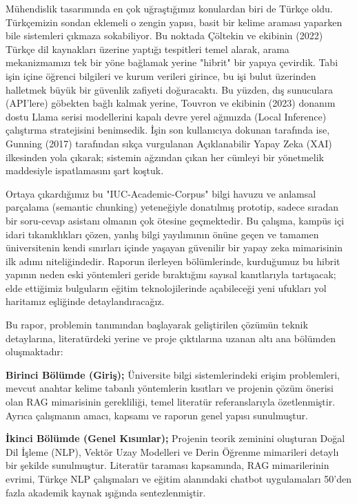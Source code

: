 \documentclass[12pt,a4paper]{report}
\begin{document}
Mühendislik tasarımında en çok uğraştığımız konulardan biri de Türkçe oldu. Türkçemizin sondan eklemeli o zengin yapısı, basit bir kelime araması yaparken bile sistemleri çıkmaza sokabiliyor. Bu noktada Çöltekin ve ekibinin (2022) Türkçe dil kaynakları üzerine yaptığı tespitleri \cite{coltekin2022turkish} temel alarak, arama mekanizmamızı tek bir yöne bağlamak yerine "hibrit" bir yapıya çevirdik. Tabi işin içine öğrenci bilgileri ve kurum verileri girince, bu işi bulut üzerinden halletmek büyük bir güvenlik zafiyeti doğuracaktı. Bu yüzden, dış sunuculara (API'lere) göbekten bağlı kalmak yerine, Touvron ve ekibinin (2023) donanım dostu Llama serisi modellerini \cite{touvron2023llama} kapalı devre yerel ağımızda (Local Inference) çalıştırma stratejisini benimsedik. İşin son kullanıcıya dokunan tarafında ise, Gunning (2017) tarafından sıkça vurgulanan Açıklanabilir Yapay Zeka (XAI) ilkesinden \cite{gunning2017explainable} yola çıkarak; sistemin ağzından çıkan her cümleyi bir yönetmelik maddesiyle ispatlamasını şart koştuk.

Ortaya çıkardığımız bu "IUC-Academic-Corpus" bilgi havuzu ve anlamsal parçalama (semantic chunking) yeteneğiyle donatılmış prototip, sadece sıradan bir soru-cevap asistanı olmanın çok ötesine geçmektedir. Bu çalışma, kampüs içi idari tıkanıklıkları çözen, yanlış bilgi yayılımının önüne geçen ve tamamen üniversitenin kendi sınırları içinde yaşayan güvenilir bir yapay zeka mimarisinin ilk adımı niteliğindedir. Raporun ilerleyen bölümlerinde, kurduğumuz bu hibrit yapının neden eski yöntemleri geride bıraktığını sayısal kanıtlarıyla tartışacak; elde ettiğimiz bulguların eğitim teknolojilerinde açabileceği yeni ufukları yol haritamız eşliğinde detaylandıracağız.

Bu rapor, problemin tanımından başlayarak geliştirilen çözümün teknik detaylarına, literatürdeki yerine ve proje çıktılarına uzanan altı ana bölümden oluşmaktadır:

\textbf{Birinci Bölümde (Giriş);} Üniversite bilgi sistemlerindeki erişim problemleri, mevcut anahtar kelime tabanlı yöntemlerin kısıtları ve projenin çözüm önerisi olan RAG mimarisinin gerekliliği, temel literatür referanslarıyla özetlenmiştir. Ayrıca çalışmanın amacı, kapsamı ve raporun genel yapısı sunulmuştur.

\textbf{İkinci Bölümde (Genel Kısımlar);} Projenin teorik zeminini oluşturan Doğal Dil İşleme (NLP), Vektör Uzay Modelleri ve Derin Öğrenme mimarileri detaylı bir şekilde sunulmuştur. Literatür taraması kapsamında, RAG mimarilerinin evrimi, Türkçe NLP çalışmaları ve eğitim alanındaki chatbot uygulamaları 50'den fazla akademik kaynak ışığında sentezlenmiştir.
\end{document}
